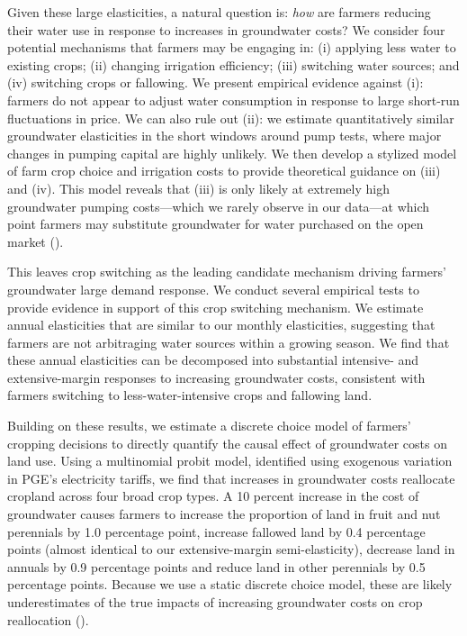 Given these large elasticities, a natural question is: \emph{how} are farmers reducing their water use in response to increases in groundwater costs? We consider four potential mechanisms that farmers may be engaging in: (i) applying less water to existing crops; (ii) changing irrigation efficiency; (iii) switching water sources; and (iv) switching crops or fallowing. We present empirical evidence against (i): farmers do not appear to adjust water consumption in response to large short-run fluctuations in price. We can also rule out (ii): we estimate quantitatively similar groundwater elasticities in the short windows around pump tests, where major changes in pumping capital are highly unlikely. We then develop a stylized model of farm crop choice and irrigation costs to provide theoretical guidance on (iii) and (iv). This model reveals that (iii) is only likely at extremely high groundwater pumping costs---which we rarely observe in our data---at which point farmers may substitute groundwater for water purchased on the open market (\textcite{hagerty2018}).

This leaves crop switching as the leading candidate mechanism driving farmers' groundwater large demand response. We conduct several empirical tests to provide evidence in support of this crop switching mechanism. We estimate annual elasticities that are similar to our monthly elasticities, suggesting that farmers are not arbitraging water sources within a growing season. We find that these annual elasticities can be decomposed into substantial intensive- and extensive-margin responses to increasing groundwater costs, consistent with farmers switching to less-water-intensive crops and fallowing land. 

Building on these results, we estimate a discrete choice model of farmers' cropping decisions to directly quantify the causal effect of groundwater costs on land use. Using a multinomial probit model, identified using exogenous variation in PGE's electricity tariffs, we find that increases in groundwater costs reallocate cropland across four broad crop types. A 10 percent increase in the cost of groundwater causes farmers to increase the proportion of land in fruit and nut perennials by 1.0 percentage point, increase fallowed land by 0.4 percentage points (almost identical to our extensive-margin semi-elasticity), decrease land in annuals by 0.9 percentage points and reduce land in other perennials by 0.5 percentage points. Because we use a static discrete choice model, these are likely underestimates of the true impacts of increasing groundwater costs on crop reallocation (\textcite{scott2013}). %


